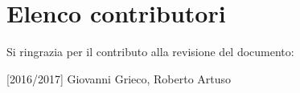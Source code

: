 \chapter*{Elenco contributori}
Si ringrazia per il contributo alla revisione del documento:

[2016/2017]
Giovanni Grieco, 
Roberto Artuso
